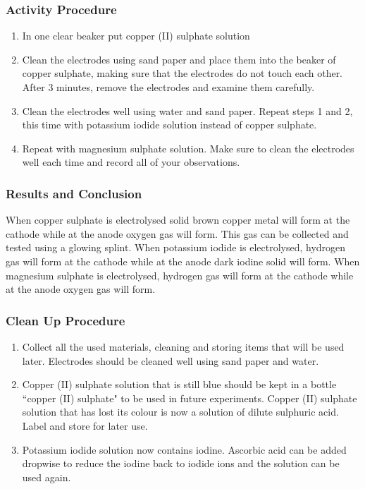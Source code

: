 \subsubsection*{Activity Procedure}
\begin{enumerate}
\item{In one clear beaker put copper (II) sulphate solution}
\item{Clean the electrodes using sand paper and place them into the beaker of copper sulphate, making sure that the electrodes do not touch each other. After 3 minutes, remove the electrodes and examine them carefully.}
\item{Clean the electrodes well using water and sand paper. Repeat steps 1 and 2, this time with potassium iodide solution instead of copper sulphate.}
\item{Repeat with magnesium sulphate solution. Make sure to clean the electrodes well each time and record all of your observations.}
\end{enumerate}

\subsubsection*{Results and Conclusion}
When copper sulphate is electrolysed solid brown copper metal will form at the cathode while at the anode oxygen gas will form. This gas can be collected and tested using a glowing splint.
When potassium iodide is electrolysed, hydrogen gas will form at the cathode while at the anode dark iodine solid will form.
When magnesium sulphate is electrolysed, hydrogen gas will form at the cathode while at the anode oxygen gas will form.

\subsubsection*{Clean Up Procedure}
\begin{enumerate}
\item{Collect all the used materials, cleaning and storing items that will be used later. Electrodes should be cleaned well using sand paper and water.}
\item{Copper (II) sulphate solution that is still blue should be kept in a bottle ``copper (II) sulphate" to be used in future experiments. Copper (II) sulphate solution that has lost its colour is now a solution of dilute sulphuric acid. Label and store for later use.}
\item{Potassium iodide solution now contains iodine. Ascorbic acid can be added dropwise to reduce the iodine back to iodide ions and the solution can be used again.}
\end{enumerate}

